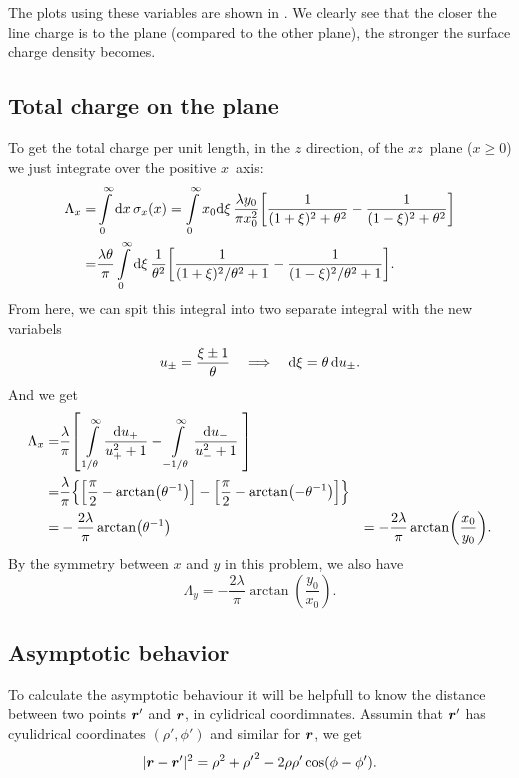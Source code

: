\documentclass[11pt,letter, swedish, english
]{article}
\let\oldint\int
\renewcommand{\int}{\oldint\limits}
\begin{document}
The plots using these variables are shown in . We
clearly see that the closer the line charge is to the plane (compared
to the other plane), the stronger the surface charge density becomes. 

\subsection{Total charge on the plane}
To get the total charge per unit length, in the $z$ direction, of the
$xz$~plane ($x\ge0$) we just integrate over the positive $x$~axis:
\begin{equation}
\begin{aligned}
\Lambda_x=&\int_0^\infty\rd{x}\,\sigma_x(x)
=\int_0^\infty x_0\rd{\xi}\,\frac{\lambda y_0}{\pi x_0^2}
\qty[\frac{1}{(1+\xi)^2+\theta^2}-\frac{1}{(1-\xi)^2+\theta^2}]\\
=&\frac{\lambda \theta}{\pi}
\int_0^\infty \rd{\xi}\,\frac{1}{\theta^2}
\qty[\frac{1}{(1+\xi)^2/\theta^2+1}-\frac{1}{(1-\xi)^2/\theta^2+1}].
\end{aligned}
\end{equation}
From here, we can spit this integral into two separate integral with
the new variabels
\begin{equation}
u_\pm=\frac{\xi\pm1}{\theta}
\quad\Longrightarrow\quad
\mathrm{d}\xi=\theta\,\mathrm{d}{u_\pm}.
\end{equation}
And we get
\begin{equation}
\begin{aligned}
\Lambda_x=&\frac{\lambda}{\pi}
\qty[\;\int_{1/\theta}^\infty \frac{\rd u_+}{u_+^2+1}
-\int_{-1/\theta}^\infty\frac{\rd u_-}{u_-^2+1}\;]\\
=&\frac{\lambda}{\pi}\qty{
\qty[\frac{\pi}{2}-\arctan(\theta^{-1})]
-\qty[\frac{\pi}{2}-\arctan(-\theta^{-1})]}\\
=&-\frac{2\lambda}{\pi}\arctan(\theta^{-1})
&=-\frac{2\lambda}{\pi}\arctan(\frac{x_0}{y_0}).
\end{aligned}
\end{equation}
By the symmetry between $x$ and $y$ in this problem, we also have
\begin{equation}
\Lambda_y=-\frac{2\lambda}{\pi}\arctan(\frac{y_0}{x_0}).
\end{equation}


\subsection{Asymptotic behavior}
To calculate the asymptotic behaviour it will be helpfull to know
the distance between two points $\vb*r'$ and $\vb*r$, in cylidrical
coordimnates. Assumin that $\vb*r'$ has cyulidrical coordinates
$(\rho', \phi')$ and similar for $\vb*r$, we get
\begin{equation}
|\vb*r-\vb*r'|^2=\rho^2+{\rho'}^2-2\rho\rho'\cos(\phi-\phi').
\end{equation}
\end{document}
